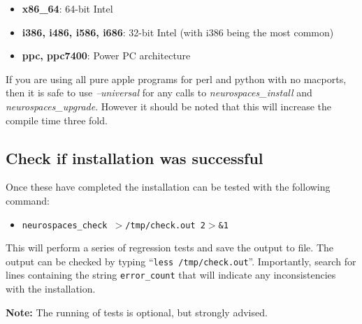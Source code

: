 \documentclass[12pt]{article}
\begin{document}
\begin{itemize}
   \item[] {\bf x86\_64}: 64-bit Intel 
   \item[] {\bf i386, i486, i586, i686}: 32-bit Intel (with i386 being the most common)
   \item[] {\bf ppc, ppc7400}: Power PC architecture
\end{itemize}

If you are using all pure apple programs for perl and python with no macports, then it is safe to use {\it --universal} for any calls to {\it neurospaces\_install} and {\it neurospaces\_upgrade}. However it should be noted that this will increase the compile time three fold.

\subsection*{Check if installation was successful}

Once these have completed the installation can be tested with the following command:
\begin{itemize}
   \item[]{\tt neurospaces\_check $>$/tmp/check.out 2$>$\&1}
\end{itemize}
This will perform a series of regression tests and save the output to file. The output can be checked by typing ``{\tt less /tmp/check.out}''. Importantly, search for lines containing the string {\tt error\_count} that will indicate any inconsistencies with the installation.

{\bf Note:} The running of tests is optional, but strongly advised.
\end{document}
